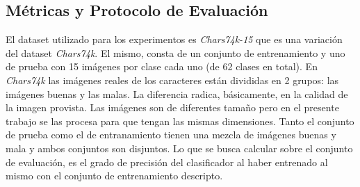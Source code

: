 \subsection{Métricas y Protocolo de Evaluación}


	El dataset utilizado para los experimentos es \textit{Chars74k-15} que es una variación del dataset \textit{Chars74k}. El mismo, consta de un conjunto de entrenamiento y uno de prueba con 15 imágenes por clase cada uno (de 62 clases en total). En \textit{Chars74k} las imágenes reales de los caracteres están divididas en 2 grupos: las imágenes buenas y las malas. La diferencia radica, básicamente, en la calidad de la imagen provista. Las imágenes son de diferentes tamaño pero en el presente trabajo se las procesa para que tengan las mismas dimensiones. Tanto el conjunto de prueba como el de entranamiento tienen una mezcla de imágenes buenas y mala y ambos conjuntos son disjuntos.  Lo que se busca calcular sobre el conjunto de evaluación, es el grado de precisión del clasificador al haber entrenado al mismo con el conjunto de entrenamiento descripto.